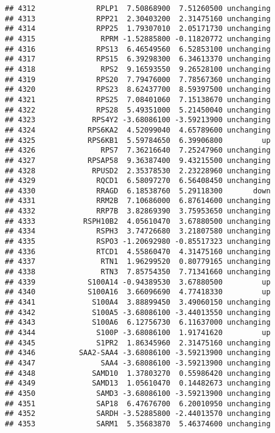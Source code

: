 \documentclass[]{article}
\begin{document}
\begin{verbatim}
## 4312              RPLP1  7.50868900  7.51260500 unchanging
## 4313              RPP21  2.30403200  2.31475160 unchanging
## 4314              RPP25  1.79307010  2.05171730 unchanging
## 4315               RPRM -1.52885800 -0.11820772 unchanging
## 4316              RPS13  6.46549560  6.52853100 unchanging
## 4317              RPS15  6.39298300  6.34613370 unchanging
## 4318               RPS2  9.16593550  9.26528100 unchanging
## 4319              RPS20  7.79476000  7.78567360 unchanging
## 4320              RPS23  8.62437700  8.59397500 unchanging
## 4321              RPS25  7.08401060  7.15138670 unchanging
## 4322              RPS28  5.49351000  5.21450040 unchanging
## 4323             RPS4Y2 -3.68086100 -3.59213900 unchanging
## 4324            RPS6KA2  4.52099040  4.65789600 unchanging
## 4325            RPS6KB1  5.59784650  6.39906800         up
## 4326               RPS7  7.36216640  7.25247960 unchanging
## 4327            RPSAP58  9.36387400  9.43215500 unchanging
## 4328             RPUSD2  2.35378530  2.23228960 unchanging
## 4329              RQCD1  6.58097270  6.56408450 unchanging
## 4330              RRAGD  6.18538760  5.29118300       down
## 4331              RRM2B  7.10686000  6.87614600 unchanging
## 4332              RRP7B  3.82869390  3.75953650 unchanging
## 4333           RSPH10B2  4.05610470  3.67880500 unchanging
## 4334              RSPH3  3.74726680  3.21807580 unchanging
## 4335              RSPO3 -1.20692980 -0.85517323 unchanging
## 4336              RTCD1  4.55860470  4.31475160 unchanging
## 4337               RTN1  1.96299520  0.80779165 unchanging
## 4338               RTN3  7.85754350  7.71341660 unchanging
## 4339            S100A14 -0.94389530  3.67880500         up
## 4340            S100A16  3.66096690  4.77418330         up
## 4341             S100A4  3.88899450  3.49060150 unchanging
## 4342             S100A5 -3.68086100 -3.44013550 unchanging
## 4343             S100A6  6.12756730  6.11637000 unchanging
## 4344              S100P -3.68086100  1.91741620         up
## 4345              S1PR2  1.86345960  2.31475160 unchanging
## 4346          SAA2-SAA4 -3.68086100 -3.59213900 unchanging
## 4347               SAA4 -3.68086100 -3.59213900 unchanging
## 4348             SAMD10  1.37803270  0.55986420 unchanging
## 4349             SAMD13  1.05610470  0.14482673 unchanging
## 4350              SAMD3 -3.68086100 -3.59213900 unchanging
## 4351              SAP18  6.47676700  6.20010950 unchanging
## 4352              SARDH -3.52885800 -2.44013570 unchanging
## 4353              SARM1  5.35683870  5.46374600 unchanging

\end{verbatim}
\end{document}
